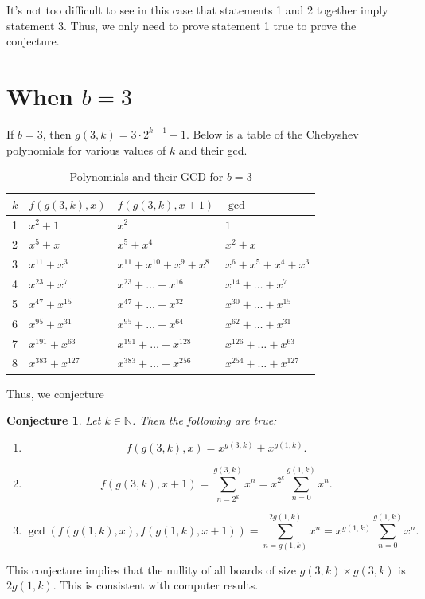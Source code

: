 \documentclass{article}
\newtheorem{conjecture}{Conjecture}
\newcommand{\N}{\mathbb{N}}
\begin{document}
	It's not too difficult to see in this case that statements 1 and 2 together imply statement 3.
	Thus, we only need to prove statement 1 true to prove the conjecture.
	
	\newpage
	\section{When $b = 3$}
	If $b=3$, then $g(3,k) = 3\cdot2^{k-1} - 1$.
	Below is a table of the Chebyshev polynomials for various values of $k$ and their gcd.
	
	\begin{table}[H]
		\renewcommand{\arraystretch}{1.5}
		\centering
		\begin{tabular}{|l||l|l|l|}
			\hline
			$k$ & $f(g(3,k),x)$ & $f(g(3,k),x+1)$ & $\gcd$  \\
			\hline\hline
			1 & $x^2 + 1$ & $x^2$ & $1$ \\
			\hline
			2 & $x^5 + x$ & $x^5 + x^4$ & $x^2 + x$ \\
			\hline
			3 & $x^{11} + x^3$ & $x^{11} + x^{10} + x^9 + x^8$ & $x^6 + x^5 + x^4 + x^3$ \\
			\hline
			4 & $x^{23} + x^{7}$ & $x^{23} + \dots + x^{16}$ & $x^{14} + \dots + x^7$ \\
			\hline
			5 & $x^{47} + x^{15}$ & $x^{47} + \dots + x^{32}$ & $x^{30} + \dots + x^{15}$ \\
			\hline
			6 & $x^{95} + x^{31}$ & $x^{95} + \dots + x^{64}$ & $x^{62} + \dots + x^{31}$ \\
			\hline
			7 & $x^{191} + x^{63}$ & $x^{191} + \dots + x^{128}$ & $x^{126} + \dots + x^{63}$ \\
			\hline
			8 & $x^{383} + x^{127}$ & $x^{383} + \dots + x^{256}$ & $x^{254} + \dots + x^{127}$ \\
			\hline  
		\end{tabular}
		\caption{Polynomials and their GCD for $b=3$}
	\end{table}
	Thus, we conjecture
	\begin{conjecture}
		Let $k \in \N$.
		Then the following are true:
		\begin{enumerate}
			\item
			\begin{equation*}
				f(g(3,k),x) = x^{g(3,k)} + x^{g(1,k)}.
			\end{equation*}
			\item
			\begin{equation*}
				f(g(3,k),x+1) = \sum_{n=2^k}^{g(3,k)}{x^n} = x^{2^k}\sum_{n=0}^{g(1,k)}{x^n}.
			\end{equation*}
			\item
			\begin{equation*}
				\gcd\left({f(g(1,k),x), f(g(1,k),x+1)}\right) = \sum_{n=g(1,k)}^{2g(1,k)}{x^n} = x^{g(1,k)}\sum_{n=0}^{g(1,k)}{x^n}.
			\end{equation*}
		\end{enumerate}
	\end{conjecture}
	This conjecture implies that the nullity of all boards of size $g(3,k) \times g(3,k)$ is $2g(1,k)$.
	This is consistent with computer results.
	
\end{document}
